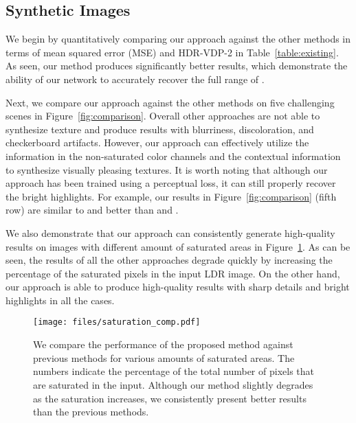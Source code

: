\subsection{Synthetic Images}
We begin by quantitatively comparing our approach against the other methods in terms of mean squared error (MSE) and HDR-VDP-2 \cite{mantiuk2011hdr} in Table~\ref{table:existing}. 
As seen, our method produces significantly better results, which demonstrate the ability of our network to accurately recover the full range of .

Next, we compare our approach against the other methods on five challenging scenes in Figure~\ref{fig:comparison}. Overall other approaches are not able to synthesize texture and produce results with blurriness, discoloration, and checkerboard artifacts. However, our approach can effectively utilize the information in the non-saturated color channels and the contextual information to synthesize visually pleasing textures. It is worth noting that although our approach has been trained using a perceptual loss, it can still properly recover the bright highlights. For example, our results in Figure~\ref{fig:comparison} (fifth row) are similar to \citet{eilertsen2017hdr} and better than \citet{endo2017deep} and \citet{marnerides2018expandnet}.

We also demonstrate that our approach can consistently generate high-quality results on images with different amount of saturated areas in Figure~\ref{fig:ligh_saturation}. As can be seen, the results of all the other approaches degrade quickly by increasing the percentage of the saturated pixels in the input LDR image. On the other hand, our approach is able to produce high-quality results with sharp details and bright highlights in all the cases.

\begin{figure}
  \texttt{[image: files/saturation\_comp.pdf]}
  \vspace{-0.15in}
  \caption{We compare the performance of the proposed method against previous methods for various amounts of saturated areas. The numbers indicate the percentage of the total number of pixels that are saturated in the input. Although our method slightly degrades as the saturation increases, we consistently present better results than the previous methods.}
  \label{fig:ligh_saturation}
  \vspace{-0.20in}
\end{figure}

